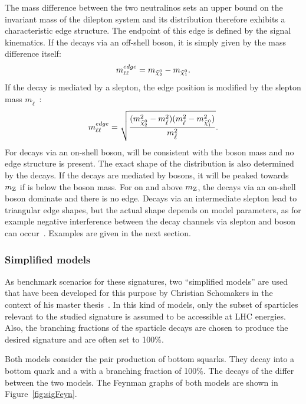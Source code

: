 The mass difference between the two neutralinos sets an upper bound on the invariant mass of the dilepton system \mll and its distribution therefore exhibits a characteristic edge structure. The endpoint of this edge is defined by the signal kinematics.  If the \secondchi decays via an off-shell \Z boson, it is simply given by the mass difference itself:
\begin{equation}
m_{\ell\ell}^{edge} = m_{{\tilde{\chi}^0_2}} - m_{{\tilde{\chi}^0_1}}.
\end{equation}
If the decay is mediated by a slepton, the edge position is modified by the slepton mass $m_{\tilde{\ell}}$~\cite{PhysRevD.55.5520}:
\begin{equation}
m_{\ell\ell}^{edge} = \sqrt{\frac{(m_{{\tilde{\chi}^0_2}}^2-m_{\tilde{\ell}}^2)(m_{\tilde{\ell}}^2-m_{{\tilde{\chi}^0_1}}^2)}{m_{\tilde{\ell}}^2}}. 
\end{equation}
For decays via an on-shell \Z boson, \mll will be consistent with the \Z boson mass and no edge structure is present. The exact shape of the distribution is also determined by the decays. If the decays are mediated by \Z bosons, it will be peaked towards $m_{\mathrm{Z}}$ if \mlledge is below the \Z boson mass. For \mlledge on and above $m_{\mathrm{Z}}$, the decays via an on-shell \Z boson dominate and there is no edge. Decays via an intermediate slepton lead to triangular edge shapes, but the actual shape depends on model parameters, as for example negative interference between the decay channels via slepton and \Z boson can occur~\cite{Nojiri:1999ki}. Examples are given in the next section.
\subsubsection{Simplified models}
\label{sec:models}
As benchmark scenarios for these signatures, two ``simplified models'' are used that have been developed for this purpose by Christian Schomakers in the context of his master thesis~\cite{Schomakers:2014zza}. In this kind of models, only the subset of sparticles relevant to the studied signature is assumed to be accessible at LHC energies. Also, the branching fractions of the sparticle decays are chosen to produce the desired signature and are often set to 100\%.  

Both models consider the pair production of bottom squarks. They decay into a bottom quark and a \secondchi with a branching fraction of 100\%. The decays of the \secondchi differ between the two models. The Feynman graphs of both models are shown in Figure~\ref{fig:sigFeyn}.

